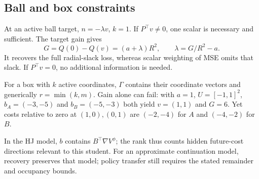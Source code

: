 \subsection{Ball and box constraints}
At an active ball target, $n=-\lambda v$, $k=1$. If $P^\top v\ne0$,
one scalar is necessary and sufficient. The target gain gives
\begin{equation}\label{eq:gain-normal}
 G=Q(0)-Q(v)=(a+\lambda)R^2,\qquad\lambda=G/R^2-a.
\end{equation}
It recovers the full radial-slack loss, whereas scalar weighting of
MSE omits that slack. If $P^\top v=0$, no additional information is needed.

For a box with $k$ active coordinates, $\Gamma$ contains their coordinate
vectors and generically $r=\min(k,m)$. Gain alone can fail: with
$a=1$, $U=[-1,1]^2$, $b_A=(-3,-5)$ and $b_B=(-5,-3)$ both yield
$v=(1,1)$ and $G=6$. Yet costs relative to zero at $(1,0),(0,1)$
are $(-2,-4)$ for $A$ and $(-4,-2)$ for $B$.

In the HJ model, $b$ contains $B^\top\nabla V^\phi$; the rank thus
counts hidden future-cost directions relevant to this student.
For an approximate continuation model, recovery preserves that model;
policy transfer still requires the stated remainder and occupancy bounds.
